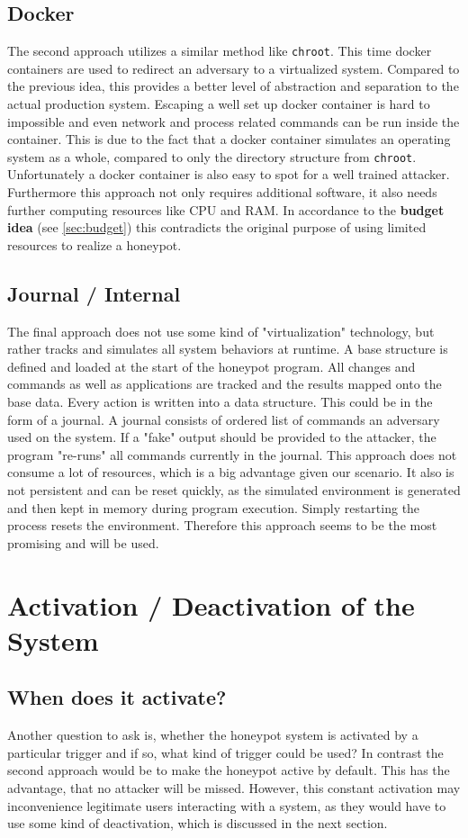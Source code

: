 \subsection{Docker}
The second approach utilizes a similar method like \texttt{chroot}.
This time docker containers are used to redirect an adversary to a virtualized system.
Compared to the previous idea, this provides a better level of abstraction and separation to the actual production system.
Escaping a well set up docker container is hard to impossible and even network and process related commands can be run inside the container.
This is due to the fact that a docker container simulates an operating system as a whole, compared to only the directory structure from \texttt{chroot}.
Unfortunately a docker container is also easy to spot for a well trained attacker.
Furthermore this approach not only requires additional software, it also needs further computing resources like CPU and RAM.
In accordance to the \textbf{budget idea} (see \autoref{sec:budget}) this contradicts the original purpose of using limited resources to realize a honeypot.

\subsection{Journal / Internal}
The final approach does not use some kind of "virtualization" technology, but rather tracks and simulates all system behaviors at runtime.
A base structure is defined and loaded at the start of the honeypot program.
All changes and commands as well as applications are tracked and the results mapped onto the base data.
Every action is written into a data structure.
This could be in the form of a journal.
A journal consists of ordered list of commands an adversary used on the system.
If a "fake" output should be provided to the attacker, the program "re-runs" all commands currently in the journal.
This approach does not consume a lot of resources, which is a big advantage given our scenario. It also is not persistent and can be reset quickly, as the simulated environment is generated and then kept in memory during program execution. Simply restarting the process resets the environment. Therefore this approach seems to be the most promising and will be used.


\section{Activation / Deactivation of the System}
\subsection{When does it activate?}
Another question to ask is, whether the honeypot system is activated by a particular trigger and if so, what kind of trigger could be used?
In contrast the second approach would be to make the honeypot active by default.
This has the advantage, that no attacker will be missed.
However, this constant activation may inconvenience legitimate users interacting with a system, as they would have to use some kind of deactivation, which is discussed in the next section.

